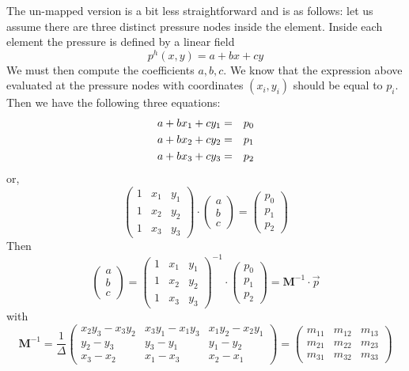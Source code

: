 The un-mapped version is a bit less straightforward and is as follows:
let us assume there are three distinct pressure nodes inside the element.
Inside each element the pressure is defined by a linear field
\[
p^h(x,y) = a+bx+cy
\]
We must then compute the coefficients $a,b,c$. We know that 
the expression above evaluated at the pressure nodes with 
coordinates $(x_i,y_i)$ should be equal to $p_i$. 
Then we have the following three equations:
\begin{eqnarray}
a + bx_1 + cy_1 &=& p_0 \nonumber\\
a + bx_2 + cy_2 &=& p_1 \nonumber\\
a + bx_3 + cy_3 &=& p_2 \nonumber
\end{eqnarray}
or, 
\[
\left(
\begin{array}{ccc}
1 & x_1 & y_1 \\
1 & x_2 & y_2 \\
1 & x_3 & y_3 
\end{array}
\right)
\cdot 
\left(
\begin{array}{ccc}
a \\ b \\ c
\end{array}
\right)
=
\left(
\begin{array}{ccc}
p_0 \\ p_1 \\ p_2
\end{array}
\right)
\]
Then 
\[
\left(
\begin{array}{ccc}
a \\ b \\ c
\end{array}
\right)
=
\left(
\begin{array}{ccc}
1 & x_1 & y_1 \\
1 & x_2 & y_2 \\
1 & x_3 & y_3 
\end{array}
\right)^{-1}
\cdot
\left(
\begin{array}{ccc}
p_0 \\ p_1 \\ p_2
\end{array}
\right)
= {\bm M}^{-1} \cdot \vec{p}
\]
with 
\[
{\bm M}^{-1} = \frac{1}{\Delta}
\left(
\begin{array}{ccc}
x_2y_3-x_3y_2 & x_3y_1-x_1y_3 & x_1y_2-x_2y_1 \\
y_2-y_3 & y_3-y_1 & y_1-y_2 \\
x_3-x_2 & x_1-x_3 & x_2-x_1
\end{array}
\right)
=
\left(
\begin{array}{ccc}
m_{11} & m_{12} & m_{13} \\
m_{21} & m_{22} & m_{23} \\
m_{31} & m_{32} & m_{33} 
\end{array}
\right)
\]

